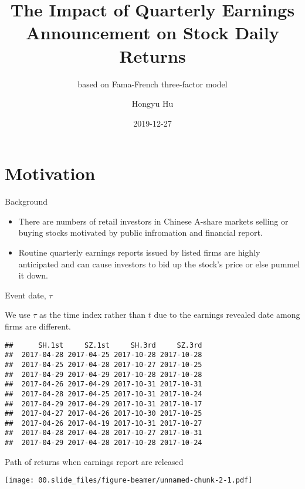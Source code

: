 \documentclass[
11pt,
ignorenonframetext,
]{beamer}
\title{The Impact of Quarterly Earnings Announcement on Stock Daily Returns}
\subtitle{based on Fama-French three-factor model}
\author{Hongyu Hu}
\institute[JNU]
{\textit{huhy.jnu@gmail.com} \\ %
\medskip
\textit{huhy\_1995@163.com} 
}
\date{2019-12-27}
\begin{document}
\frame{\titlepage}

\hypertarget{motivation}{%
\section{Motivation}\label{motivation}}

\begin{frame}{Background}
\protect\hypertarget{background}{}

\begin{itemize}
\item
  There are numbers of retail investors in Chinese A-share markets
  selling or buying stocks motivated by public infromation and financial
  report.
\item
  Routine quarterly earnings reports issued by listed firms are highly
  anticipated and can cause investors to bid up the stock's price or
  else pummel it down.
\end{itemize}

\end{frame}

\begin{frame}[fragile]{Event date, \(\tau\)}
\protect\hypertarget{event-date-tau}{}

We use \(\tau\) as the time index rather than \(t\) due to the earnings
revealed date among firms are different.

\begin{verbatim}
##      SH.1st     SZ.1st     SH.3rd     SZ.3rd
##  2017-04-28 2017-04-25 2017-10-28 2017-10-28
##  2017-04-25 2017-04-28 2017-10-27 2017-10-25
##  2017-04-29 2017-04-29 2017-10-28 2017-10-28
##  2017-04-26 2017-04-29 2017-10-31 2017-10-31
##  2017-04-28 2017-04-25 2017-10-31 2017-10-24
##  2017-04-29 2017-04-29 2017-10-31 2017-10-17
##  2017-04-27 2017-04-26 2017-10-30 2017-10-25
##  2017-04-26 2017-04-19 2017-10-31 2017-10-27
##  2017-04-28 2017-04-28 2017-10-27 2017-10-31
##  2017-04-29 2017-04-28 2017-10-28 2017-10-24
\end{verbatim}

\end{frame}

\begin{frame}{Path of returns when earnings report are released}
\protect\hypertarget{path-of-returns-when-earnings-report-are-released}{}

\texttt{[image: 00.slide\_files/figure-beamer/unnamed-chunk-2-1.pdf]}

\end{frame}
\end{document}
